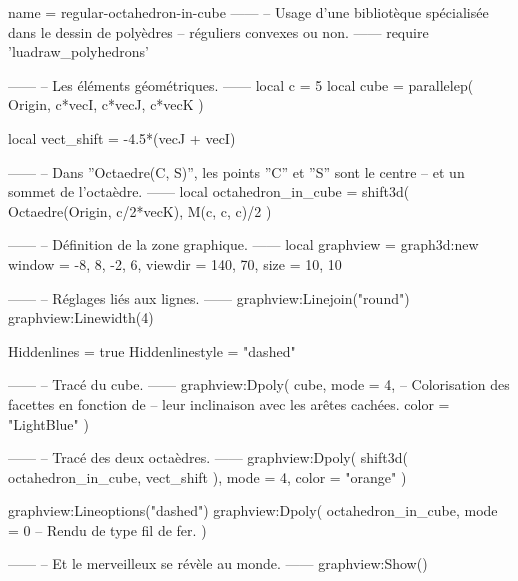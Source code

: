 \documentclass{standalone}
\begin{document}
\begin{luadraw}{name = regular-octahedron-in-cube}
------
-- Usage d'une bibliotèque spécialisée dans le dessin de polyèdres
-- réguliers convexes ou non.
------
require 'luadraw_polyhedrons'

------
-- Les éléments géométriques.
------
local c = 5
local cube = parallelep(
  Origin,
  c*vecI, c*vecJ, c*vecK
)

local vect_shift = -4.5*(vecJ + vecI)

------
-- Dans ''Octaedre(C, S)'', les points ''C'' et ''S'' sont le centre
-- et un sommet de l'octaèdre.
------
local octahedron_in_cube = shift3d(
  Octaedre(Origin, c/2*vecK),
  M(c, c, c)/2
)

------
-- Définition de la zone graphique.
------
local graphview = graph3d:new{
  window  = {-8, 8, -2, 6},
  viewdir = {140, 70},
  size    = {10, 10}
}

------
-- Réglages liés aux lignes.
------
graphview:Linejoin("round")
graphview:Linewidth(4)

Hiddenlines     = true
Hiddenlinestyle = "dashed"

------
-- Tracé du cube.
------
graphview:Dpoly(
  cube,
  {
    mode  = 4,  -- Colorisation des facettes en fonction de
                -- leur inclinaison avec les arêtes cachées.
    color = "LightBlue"
  })

------
-- Tracé des deux octaèdres.
------
graphview:Dpoly(
  shift3d(
    octahedron_in_cube,
    vect_shift
  ),
  {
    mode = 4,
    color = "orange"
  })

graphview:Lineoptions("dashed")
graphview:Dpoly(
  octahedron_in_cube,
  {
    mode = 0  -- Rendu de type fil de fer.
  })

------
-- Et le merveilleux se révèle au monde.
------
graphview:Show()
\end{luadraw}
\end{document}
